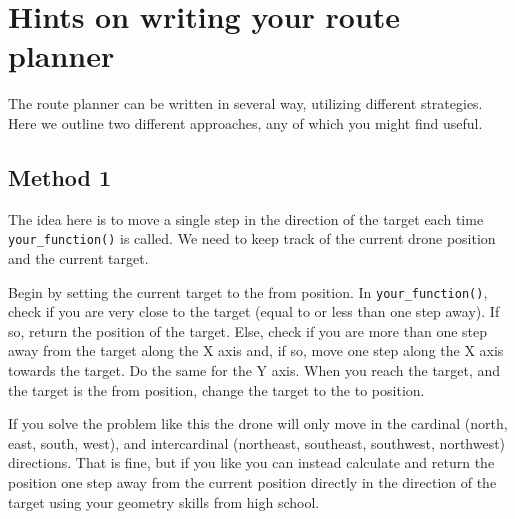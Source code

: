 \documentclass{article}
\begin{document}

\newpage
\section{Hints on writing your route planner}

The route planner can be written in several way, utilizing different strategies. Here we outline two different approaches, any of which you might find useful.

\subsection{Method 1}

The idea here is to move a single step in the direction of the target each time \texttt{your\_function()} is called. We need to keep track of the current drone position and the current target.

Begin by setting the current target to the from position. In \texttt{your\_function()}, check if you are very close to the target (equal to or less than one step away). If so, return the position of the target. Else, check if you are more than one step away from the target along the X axis and, if so, move one step along the X axis towards the target. Do the same for the Y axis. When you reach the target, and the target is the from position, change the target to the to position.

If you solve the problem like this the drone will only move in the cardinal (north, east, south, west), and intercardinal (northeast, southeast, southwest, northwest) directions. That is fine, but if you like you can instead calculate and return the position one step away from the current position directly in the direction of the target using your geometry skills from high school.
\end{document}
